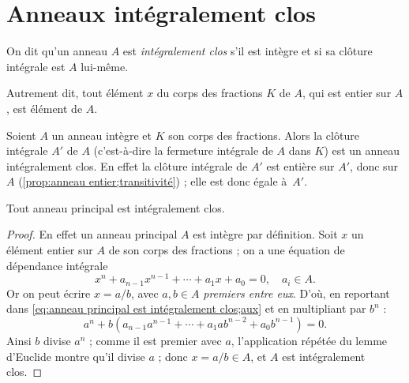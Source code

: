 \documentclass[11pt, useosf,
  title in boldface,
  theorem in new line,
  theorem numbering = section,
  number theorems separately,
]{simplivre}
\begin{document}
\section{Anneaux intégralement clos}

    \begin{definition}
        On dit qu'un anneau \( A \) est \emph{intégralement clos} s'il est intègre et si sa clôture intégrale est \( A \) lui-même.
    \end{definition}

    Autrement dit, tout élément \( x \) du corps des fractions \( K \) de \( A \), qui est entier sur \( A \), est élément de \( A \).

    \begin{example*}
        Soient \( A \) un anneau intègre et \( K \) son corps des fractions.  Alors la clôture intégrale \( A' \) de \( A \) (c'est-à-dire la fermeture intégrale de \( A \) dans \( K \)) est un anneau intégralement clos. En effet la clôture intégrale de \( A' \) est entière sur \( A' \), donc sur \( A \) (\cref{prop:anneau entier;transitivité}) ; elle est donc égale à~\( A' \).
    \end{example*}

    \begin{example*}\label{exp:anneau principal est intégralement clos}
        Tout anneau principal est intégralement clos.
    \end{example*}
    \begin{proof}
        En effet un anneau principal \( A \) est intègre par définition. Soit \( x \) un élément entier sur \( A \) de son corps des fractions ; on a une équation de dépendance intégrale
        \begin{equation}\label{eq:anneau principal est intégralement clos;aux}
            x^n + a_{n-1} x^{n-1} + \cdots + a_1 x + a_0 = 0, \quad a_i \in A.
        \end{equation}
        Or on peut écrire \( x = a/b \), avec \( a,b \in A \) \emph{premiers entre eux}. D'où, en reportant dans \eqref{eq:anneau principal est intégralement clos;aux} et en multipliant par \( b^n \) :
        \[
            a^n + b(a_{n-1} a^{n-1} + \cdots + a_1 a b^{n-2} + a_0 b^{n-1}) = 0.
        \]
        Ainsi \( b \) divise \( a^n \) ; comme il est premier avec \( a \), l'application répétée du lemme d'Euclide montre qu'il divise \( a \) ; donc \( x = a/b \in A \), et \( A \) est intégralement clos.
    \end{proof}
\end{document}
